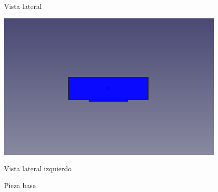 \begin{figure}[ht!]
\begin{minipage}{0.45\linewidth}
		\caption*{\centering Vista lateral}
	\end{minipage}
	\hspace{1cm}
	\begin{minipage}{0.45\linewidth}
		\centering
		\includegraphics[width=\linewidth]{figs/cap5/basetraserasin.png}
		\caption*{\centering Vista lateral izquierdo}
	\end{minipage}

	\caption{Pieza base}
	\label{fig:pbase}
\end{figure}


